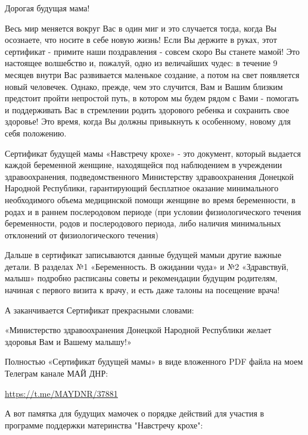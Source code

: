 \begin{zzquote}
	
Дорогая будущая мама!

Весь мир меняется вокруг Вас в один миг и это случается тогда, когда Вы
осознаете, что носите в себе новую жизнь! Если Вы держите в руках, этот
сертификат - примите наши поздравления - совсем скоро Вы станете мамой! Это
настоящее волшебство и, пожалуй, одно из величайших чудес: в течение 9 месяцев
внутри Вас развивается маленькое создание, а потом на свет появляется новый
человечек. Однако, прежде, чем это случится, Вам и Вашим близким предстоит
пройти непростой путь, в котором мы будем рядом с Вами - помогать и
поддерживать Вас в стремлении родить здорового ребенка и сохранить свое
здоровье! Это время, когда Вы должны привыкнуть к особенному, новому для себя
положению.

Сертификат будущей мамы «Навстречу крохе» - это документ, который выдается
каждой беременной женщине, находящейся под наблюдением в учреждении
здравоохранения, подведомственного Министерству здравоохранения Донецкой
Народной Республики, гарантирующий бесплатное оказание минимального
необходимого объема медицинской помощи женщине во время беременности, в родах и
в раннем послеродовом периоде (при условии физиологического течения
беременности, родов и послеродового периода, либо наличия минимальных
отклонений от физиологического течения)

Дальше в сертификат записываются данные будущей мамыи другие важные детали. В
разделах №1 «Беременность. В ожидании чуда» и №2 «Здравствуй, малыш» подробно
расписаны советы и рекомендации будущим родителям, начиная с первого визита к
врачу, и есть даже талоны на посещение врача!

\end{zzquote}

А заканчивается Сертификат прекрасными словами:

«Министерство здравоохранения Донецкой Народной Республики желает здоровья Вам
и Вашему малышу!»

Полностью «Сертификат будущей мамы» в виде вложенного PDF файла на моем
Телеграм канале МАЙ ДНР:

\url{https://t.me/MAYDNR/37881}

А вот памятка для будущих мамочек о порядке действий для участия в программе
поддержки материнства "Навстречу крохе":
